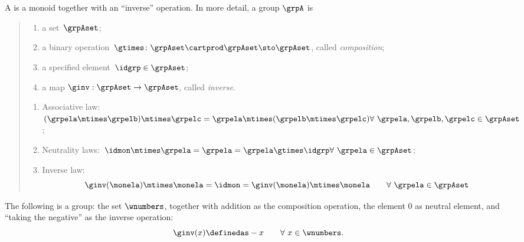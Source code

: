 

\section{}\label{sec:groups}


\begin{ctdefinition}[Group]
  \label{def:group}
  A \emph{} is a monoid together with an ``inverse'' operation.
  In more detail, a group $\grpA$ is
  \begin{quote}
    \constit
    \begin{enumerate}
      \item a set~$\grpAset$;
      \item a binary operation~$\gtimes \colon \grpAset \cartprod \grpAset \sto \grpAset$, called \emph{composition};
      \item a specified element~$\idgrp \in \grpAset$;
      \item a map $\ginv: \grpAset \to \grpAset$, called \emph{inverse}.
    \end{enumerate}
    \condit
    \begin{enumerate}
      \item Associative law:~$(\grpela\mtimes \grpelb)\mtimes \grpelc=\grpela\mtimes (\grpelb\mtimes \grpelc) \hfill \forall \  \grpela, \grpelb, \grpelc \in \grpAset$;
      \item Neutrality laws:~$\idmon\mtimes \grpela=\grpela=\grpela \gtimes \idgrp \hfill \forall \  \grpela \in \grpAset$;
      \item Inverse law:
      \begin{equation}\label{eq:group-inverse-law}
        \ginv(\monela) \mtimes \monela = \idmon = \ginv(\monela) \mtimes \monela \quad \quad \forall \  \grpela  \in \grpAset
      \end{equation}
    \end{enumerate}
  \end{quote}
\end{ctdefinition}

\begin{example}
The following is a group: the set $\wnumbers$, together with addition as the composition operation, the element $0$ as neutral element, and ``taking the negative'' as the inverse operation: 
\begin{equation}
\ginv(x) \definedas -x \quad \quad \forall \ x \in \wnumbers.
\end{equation}
\end{example}

